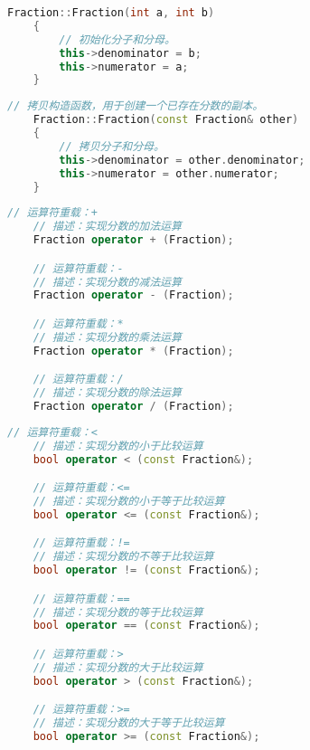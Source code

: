 \documentclass{ctexart} %
\begin{document}
\vspace{10pt}
\begin{lstlisting}[language = c++, caption=2.Ctor takes two integers as parameters]
    Fraction::Fraction(int a, int b)
    {
        // 初始化分子和分母。
        this->denominator = b;
        this->numerator = a;
    }
\end{lstlisting}

\vspace{10pt}
\begin{lstlisting}[language = c++, caption=3.Copy ctor]
    // 拷贝构造函数，用于创建一个已存在分数的副本。
    Fraction::Fraction(const Fraction& other)
    {
        // 拷贝分子和分母。
        this->denominator = other.denominator;
        this->numerator = other.numerator;
    }
\end{lstlisting}

\vspace{10pt}
\begin{lstlisting}[language = c++, caption=4.Arithmetical operators: + - * /]
    // 运算符重载：+
    // 描述：实现分数的加法运算
    Fraction operator + (Fraction);

    // 运算符重载：-
    // 描述：实现分数的减法运算
    Fraction operator - (Fraction);

    // 运算符重载：*
    // 描述：实现分数的乘法运算
    Fraction operator * (Fraction);

    // 运算符重载：/
    // 描述：实现分数的除法运算
    Fraction operator / (Fraction);

\end{lstlisting}

\vspace{10pt}
\begin{lstlisting}[language = c++, caption={5.Relational operators: \textless, \textless=, ==, !=, \textgreater=, \textgreater}]
    // 运算符重载：< 
    // 描述：实现分数的小于比较运算
    bool operator < (const Fraction&);            

    // 运算符重载：<= 
    // 描述：实现分数的小于等于比较运算
    bool operator <= (const Fraction&);

    // 运算符重载：!=
    // 描述：实现分数的不等于比较运算
    bool operator != (const Fraction&);

    // 运算符重载：==
    // 描述：实现分数的等于比较运算
    bool operator == (const Fraction&);                    

    // 运算符重载：>
    // 描述：实现分数的大于比较运算
    bool operator > (const Fraction&);                

    // 运算符重载：>=
    // 描述：实现分数的大于等于比较运算
    bool operator >= (const Fraction&);              
\end{lstlisting}
\end{document}
